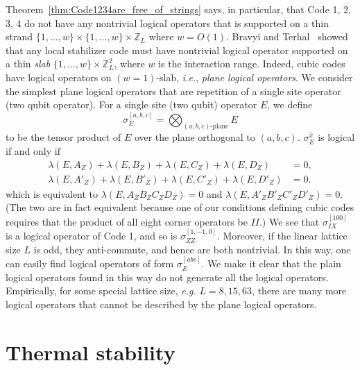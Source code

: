 \documentclass[letterpaper,10pt,pra,aps,showpacs,twocolumn]{revtex4-1}
\theoremstyle{definition} \newtheorem{defn}{Definition}
\theoremstyle{definition} \newtheorem{remark}{Remark}
\newcommand{\ie}{\emph{i.e.}}
\begin{document}
Theorem~\ref{thm:Code1234are_free_of_strings} says, in particular, that Code 1, 2, 3, 4 do not have any nontrivial logical operators that is supported on a thin strand $\{1,\ldots,w\} \times \{1,\ldots,w\} \times \mathbb{Z}_L$ where $ w = O(1) $. Bravyi and Terhal~\cite{BravyiTerhal2008no-go} showed that any local stabilizer code must have nontrivial logical operator supported on a thin \emph{slab} $\{1,\ldots,w\} \times \mathbb{Z}_L^2$, where $w$ is the interaction range. Indeed, cubic codes have logical operators on $(w=1)$-slab, \ie, \emph{plane logical operators}. We consider the simplest plane logical operators that are repetition of a single site operator (two qubit operator).
For a single site (two qubit) operator $E$, we define
\[
 \sigma^{[a,b,c]}_{E} = \bigotimes_{(a,b,c)\text{-plane}} E 
\]
to be the tensor product of $E$ over the plane orthogonal to $(a,b,c)$.
$\sigma_E^{\hat{x}}$ is logical if and only if
\begin{align*}
 \lambda(E,A_Z) + \lambda(E,B_Z) + \lambda(E,C_Z) + \lambda(E,D_Z) &= 0 ,\\
 \lambda(E,A'_Z) + \lambda(E,B'_Z) + \lambda(E,C'_Z) + \lambda(E,D'_Z) &= 0 .
\end{align*}
which is equivalent to $ \lambda( E, A_Z B_Z C_Z D_Z ) = 0 $ and $ \lambda( E, A'_Z B'_Z C'_Z D'_Z ) = 0 $.
(The two are in fact equivalent because one of our conditions defining cubic codes requires that the product of all eight corner operators be $II$.)
We see that $\sigma^{[100]}_{IX}$ is a logical operator of Code 1, and so is $\sigma^{[1,-1,0]}_{ZZ}$. Moreover, if the linear lattice size $L$ is odd, they anti-commute, and hence are both nontrivial. In this way, one can easily find logical operators of form $\sigma^{[abc]}_{E}$. We make it clear that the plain logical operators found in this way do not generate all the logical operators. Empirically, for some special lattice size, \emph{e.g.} $L=8,15,63$, there are many more logical operators that cannot be described by the plane logical operators.

\section{Thermal stability}
\label{section:thermal_stability}
\end{document}
